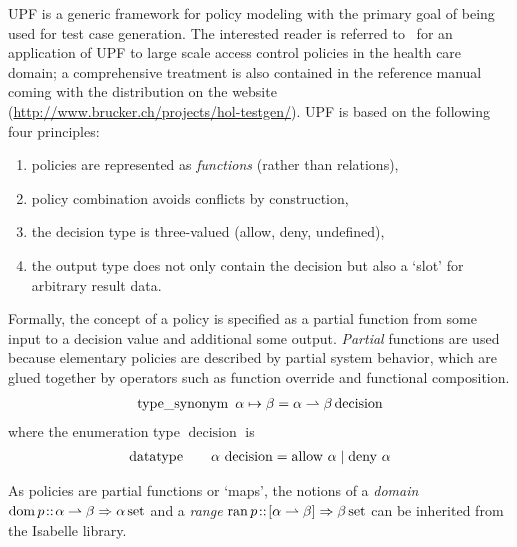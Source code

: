 UPF is a generic framework for policy modeling with the primary goal
of being used for test case generation. The interested reader is
referred to~\cite{brucker.ea:model-based:2011} for an application of
UPF to large scale access control policies in the health care domain;
a comprehensive treatment is also contained in the reference manual
coming with the distribution on the \testgen website
(\url{http://www.brucker.ch/projects/hol-testgen/}).  UPF is based on
the following four principles:
\begin{enumerate}
\item policies are represented as \emph{functions} (rather than relations),
\item policy combination avoids conflicts by construction,
\item the decision type is three-valued (allow, deny, undefined),
\item the output type does not only contain the decision but also a
  `slot' for arbitrary result data.
\end{enumerate}


Formally, the concept of a policy is specified as a partial function
from some input to a decision value and additional some
output. \emph{Partial} functions are used because elementary policies
are described by partial system behavior, which are glued together by
operators such as function override and functional composition.
\begin{gather*}
  {\operatorname{type\_synonym}}\enspace \alpha \mapsto \beta =
  \alpha \rightharpoonup \beta \operatorname{decision}
\end{gather*}
where the enumeration type $\operatorname{decision}$ is
\begin{gather*}
  {\operatorname{datatype}} \qquad \alpha\, \operatorname{decision}
  = \operatorname{allow}\, \alpha \mid
  \operatorname{deny}\, \alpha
\end{gather*}

As policies are partial functions or `maps', the notions of a
\emph{domain} $\mathrm{dom} \, p \!::\! \alpha \rightharpoonup \beta
\Rightarrow \alpha\,\mathrm{set}$ and a \emph{range} $\mathrm{ran}\, p \!::\!
[\alpha \rightharpoonup \beta] \Rightarrow \beta\,\mathrm{set}$ can be
inherited from the Isabelle library.

